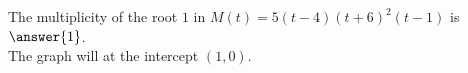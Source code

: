 \documentclass{ximera}
\begin{document}
\begin{exercise}
\begin{question}
\end{question}








\begin{question}


The multiplicity of the root $1$ in $M(t) = 5(t - 4) (t + 6)^2 (t - 1)$ is $\answer{1}$. \\



The graph will  at the intercept $(1, 0)$.



\end{question}








\end{exercise}
\end{document}
